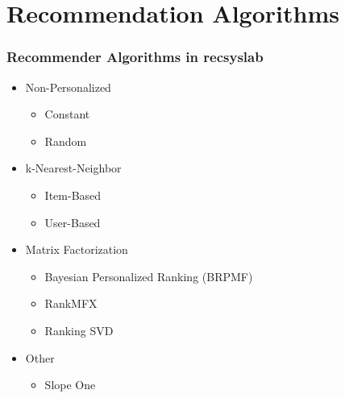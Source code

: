 \documentclass[mathserif,svgnames]{beamer}
\begin{document}
\section{Recommendation Algorithms}
\begin{frame}
    \frametitle{Recommender Algorithms in recsyslab}
    \begin{itemize}
        \item Non-Personalized
            \begin{itemize}
                \item Constant
                \item Random
            \end{itemize}
        \item k-Nearest-Neighbor
            \begin{itemize}
                \item Item-Based
                \item User-Based
            \end{itemize}
        \item Matrix Factorization
            \begin{itemize}
                \item Bayesian Personalized Ranking (BRPMF)
                \item RankMFX
                \item Ranking SVD
            \end{itemize}
        \item Other
            \begin{itemize}
                \item Slope One
            \end{itemize}
    \end{itemize}

\end{frame}
\end{document}
